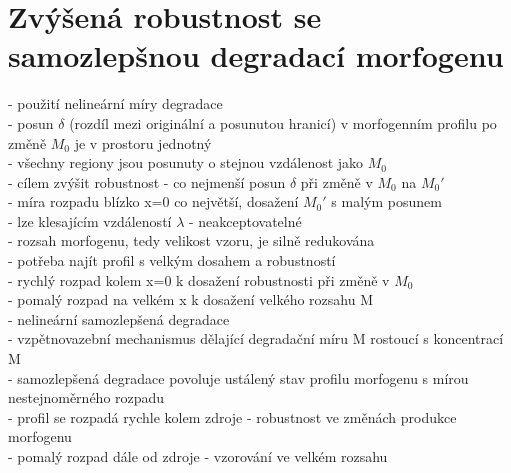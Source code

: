 \documentclass[11pt,a4paper]{report}
\begin{document}
\section{Zvýšená robustnost se samozlepšnou degradací morfogenu}
- použití nelineární míry degradace\\
- posun $\delta$ (rozdíl mezi originální a posunutou hranicí) v morfogenním profilu po změně $M_0$ je v prostoru jednotný\\
\indent - všechny regiony jsou posunuty o stejnou vzdálenost jako $M_0$\\
- cílem zvýšit robustnost - co nejmenší posun $\delta$ při změně v $M_0$ na $M_0'$\\
\indent - míra rozpadu blízko x=0 co největší, dosažení $M_0'$ s malým posunem\\
\indent \indent - lze klesajícím vzdáleností $\lambda$ - neakceptovatelné\\
\indent \indent \indent - rozsah morfogenu, tedy velikost vzoru, je silně redukována\\
\indent \indent \indent - potřeba najít profil s velkým dosahem a robustností\\
\indent \indent \indent \indent - rychlý rozpad kolem x=0 k dosažení robustnosti při změně v $M_0$\\
\indent \indent \indent \indent - pomalý rozpad na velkém x k dosažení velkého rozsahu M\\
- nelineární samozlepšená degradace\\
\indent - vzpětnovazební mechanismus dělající degradační míru M rostoucí s koncentrací M\\
\indent - samozlepšená degradace povoluje ustálený stav profilu morfogenu s mírou nestejnoměrného rozpadu\\
\indent - profil se rozpadá rychle kolem zdroje - robustnost ve změnách produkce morfogenu\\
\indent - pomalý rozpad dále od zdroje - vzorování ve velkém rozsahu\\
\end{document}

